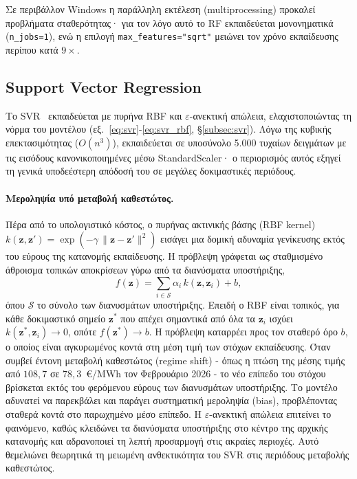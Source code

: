 Σε περιβάλλον Windows η παράλληλη εκτέλεση (multiprocessing) προκαλεί προβλήματα σταθερότητας· για τον λόγο αυτό το RF εκπαιδεύεται μονονηματικά (\texttt{n\_jobs=1}), ενώ η επιλογή \texttt{max\_features="sqrt"} μειώνει τον χρόνο εκπαίδευσης περίπου κατά $9\times$.


\subsection{Support Vector Regression}

Το SVR~\cite{smola2004} εκπαιδεύεται με πυρήνα RBF και $\varepsilon$-ανεκτική απώλεια,
ελαχιστοποιώντας τη νόρμα του μοντέλου (εξ.~\ref{eq:svr}-\ref{eq:svr_rbf},
§\ref{subsec:svr}). Λόγω της κυβικής επεκτασιμότητας ($O(n^3)$), εκπαιδεύεται σε υποσύνολο
5.000 τυχαίων δειγμάτων με τις εισόδους κανονικοποιημένες μέσω StandardScaler· ο
περιορισμός αυτός εξηγεί τη γενικά υποδεέστερη απόδοσή του σε μεγάλες δοκιμαστικές περιόδους.

\paragraph{Μεροληψία υπό μεταβολή καθεστώτος.} Πέρα από το υπολογιστικό κόστος, ο
πυρήνας ακτινικής βάσης (RBF kernel) $k(\mathbf{z}, \mathbf{z}') = \exp(-\gamma\,
\lVert \mathbf{z} - \mathbf{z}' \rVert^2)$ εισάγει μια δομική αδυναμία γενίκευσης εκτός
του εύρους της κατανομής εκπαίδευσης. Η πρόβλεψη γράφεται ως σταθμισμένο άθροισμα
τοπικών αποκρίσεων γύρω από τα διανύσματα υποστήριξης,
\begin{equation}
  f(\mathbf{z}) = \sum_{i \in \mathcal{S}} \alpha_i\, k(\mathbf{z}, \mathbf{z}_i) + b,
  \label{eq:svr_collapse}
\end{equation}
όπου $\mathcal{S}$ το σύνολο των διανυσμάτων υποστήριξης. Επειδή ο RBF είναι τοπικός,
για κάθε δοκιμαστικό σημείο $\mathbf{z}^\ast$ που απέχει σημαντικά από όλα τα
$\mathbf{z}_i$ ισχύει $k(\mathbf{z}^\ast, \mathbf{z}_i) \to 0$, οπότε $f(\mathbf{z}^\ast)
\to b$. Η πρόβλεψη καταρρέει προς τον σταθερό όρο $b$, ο οποίος είναι αγκυρωμένος κοντά
στη μέση τιμή των στόχων εκπαίδευσης. Όταν συμβεί έντονη μεταβολή καθεστώτος (regime
shift) - όπως η πτώση της μέσης τιμής από $108{,}7$ σε $78{,}3$~€/MWh τον
Φεβρουάριο 2026 - το νέο επίπεδο του στόχου βρίσκεται εκτός του φερόμενου εύρους των
διανυσμάτων υποστήριξης. Το μοντέλο αδυνατεί να παρεκβάλει και παράγει συστηματική
μεροληψία (bias), προβλέποντας σταθερά κοντά στο παρωχημένο μέσο επίπεδο. Η
$\varepsilon$-ανεκτική απώλεια επιτείνει το φαινόμενο, καθώς κλειδώνει τα διανύσματα
υποστήριξης στο κέντρο της αρχικής κατανομής και αδρανοποιεί τη λεπτή προσαρμογή στις
ακραίες περιοχές. Αυτό θεμελιώνει θεωρητικά τη μειωμένη ανθεκτικότητα του SVR στις
περιόδους μεταβολής καθεστώτος.


